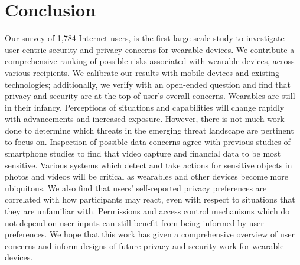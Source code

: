 
\section{Conclusion}

 Our survey of 1,784 Internet users, is the first large-scale study to investigate user-centric security and privacy concerns for wearable devices. We contribute a comprehensive ranking of possible risks associated with wearable devices, across various recipients. We calibrate our results with mobile devices and existing technologies; additionally, we verify with an open-ended question and find that privacy and security are at the top of user's overall concerns. Wearables are still in their infancy. Perceptions of situations and capabilities will change rapidly with advancements and increased exposure. However, there is not much work done to determine which threats in the emerging threat landscape are pertinent to focus on. Inspection of possible data concerns agree with previous studies of smartphone studies to find that video capture and financial data to be most sensitive. Various systems which detect and take actions for sensitive objects in photos and videos will be critical as wearables and other devices become more ubiquitous. We also find that users' self-reported privacy preferences are correlated with how participants may react, even with respect to situations that they are unfamiliar with. Permissions and access control mechanisms which do not depend on user inputs can still benefit from being informed by user preferences. We hope that this work has given a comprehensive overview of user concerns and inform designs of future privacy and security work for wearable devices. 